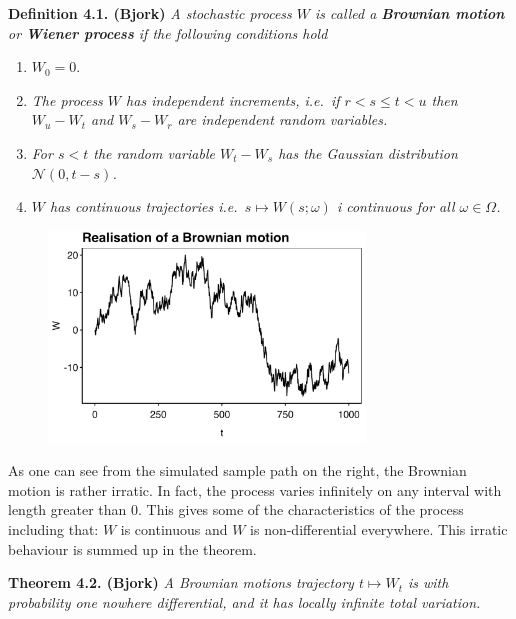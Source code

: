 \documentclass[a4paper,12pt,openany]{book}
\providecommand{\tightlist}{%
 \setlength{\itemsep}{0pt}\setlength{\parskip}{0pt}}
\begin{document}
\textbf{Definition 4.1. (Bjork)} \emph{A stochastic process \(W\) is called a \textbf{Brownian motion} or \textbf{Wiener process} if the following conditions hold}

\begin{enumerate}
\def\labelenumi{\arabic{enumi}.}
\tightlist
\item
  \(W_0=0\).
\item
  \emph{The process \(W\) has independent increments, i.e.~if \(r<s\le t< u\) then \(W_u-W_t\) and \(W_s-W_r\) are independent random variables.}
\item
  \emph{For \(s<t\) the random variable \(W_t-W_s\) has the Gaussian distribution \(\mathcal{N}(0,t-s)\).}
\item
  \emph{\(W\) has continuous trajectories i.e.~\(s\mapsto W(s;\omega)\) i continuous for all \(\omega \in\Omega\).}
\end{enumerate}

\begin{figure}[H]
  \begin{center}
    \includegraphics[width=0.75\textwidth]{figures/BM_sim.png}
  \end{center}
\end{figure}

As one can see from the simulated sample path on the right, the Brownian motion is rather irratic. In fact, the process varies infinitely on any interval with length greater than 0. This gives some of the characteristics of the process including that: \(W\) is continuous and \(W\) is non-differential everywhere. This irratic behaviour is summed up in the theorem.

\textbf{Theorem 4.2. (Bjork)} \emph{A Brownian motions trajectory \(t\mapsto W_t\) is with probability one nowhere differential, and it has locally infinite total variation.}
\end{document}
